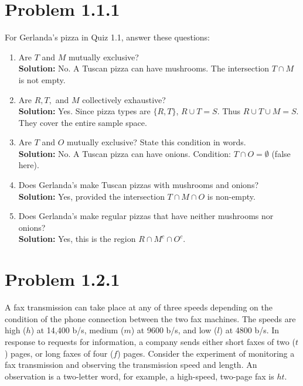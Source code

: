 \documentclass{article}
\begin{document}
\section*{Problem 1.1.1}
For Gerlanda's pizza in Quiz 1.1, answer these questions:
\begin{enumerate}[label=(\alph*)]
    \item Are $T$ and $M$ mutually exclusive? \\
    \textbf{Solution:} No. A Tuscan pizza can have mushrooms. The intersection $T \cap M$ is not empty.
    \item Are $R, T,$ and $M$ collectively exhaustive? \\
    \textbf{Solution:} Yes. Since pizza types are $\{R, T\}$, $R \cup T = S$.  Thus $R \cup T \cup M = S$. They cover the entire sample space.
    \item Are $T$ and $O$ mutually exclusive? State this condition in words. \\
    \textbf{Solution:} No. A Tuscan pizza can have onions. Condition: $T \cap O = \emptyset$ (false here).
    \item Does Gerlanda's make Tuscan pizzas with mushrooms and onions? \\
    \textbf{Solution:} Yes, provided the intersection $T \cap M \cap O$ is non-empty.
    \item Does Gerlanda's make regular pizzas that have neither mushrooms nor onions? \\
    \textbf{Solution:} Yes, this is the region $R \cap M^c \cap O^c$.
\end{enumerate}

\newpage

\section*{Problem 1.2.1}
A fax transmission can take place at any of three speeds depending on the condition of the phone connection between the two fax machines. The speeds are high ($h$) at 14,400 b/s, medium ($m$) at 9600 b/s, and low ($l$) at 4800 b/s. In response to requests for information, a company sends either short faxes of two ($t$) pages, or long faxes of four ($f$) pages. Consider the experiment of monitoring a fax transmission and observing the transmission speed and length. An observation is a two-letter word, for example, a high-speed, two-page fax is $ht$.
\end{document}
